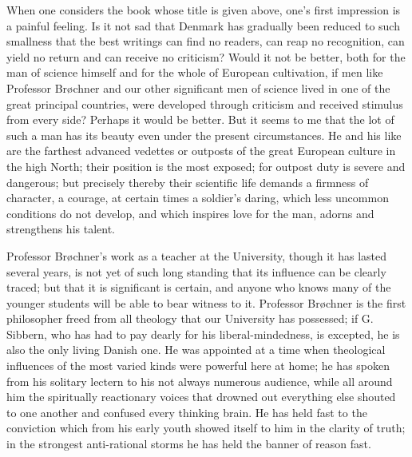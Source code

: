 \documentclass[12pt,a4paper,openany]{book}
\newcommand{\opage}[1]{\marginnote{\footnotesize\textit{[#1]}}}
\begin{document}
When one considers the book whose title is given above, one's
first impression is a painful feeling. Is it not sad that Denmark
has gradually been reduced to such smallness that the best
writings can find no readers, can reap no recognition, can yield
no return and can receive no criticism? Would it not be better,
both for the man of science himself and for the whole of European
cultivation, if men like Professor Brøchner and our other
significant men of science lived in one of the great principal
countries, were developed through criticism and received stimulus
from every side? Perhaps it would be better. But it seems to me
that the lot of such a man has its beauty even under the present
circumstances. He and his like are the farthest advanced vedettes
or outposts of the great European culture in the high North; their
position is the most exposed; for outpost duty is severe and
dangerous; but precisely thereby their scientific life demands a
firmness of character, a courage, at certain times a soldier's
daring, which less uncommon conditions do not develop, and which
inspires
love for the man, adorns and strengthens his talent.

Professor Brøchner's work as a teacher at the University,
though it has lasted several years, is not yet of such long
standing that its influence can be clearly traced; but that it is
significant is certain, and anyone who knows many of the younger
students will be able to bear witness to it. Professor Brøchner
is the first philosopher freed from all theology that our
University has possessed; if G. Sibbern, who has had to pay
dearly for his liberal-mindedness, is excepted, he is also the
only living Danish one. He was appointed at a time when
theological influences of the most varied kinds were powerful here
at home; he has spoken from his solitary lectern to his not always
numerous audience, while all around him the spiritually
reactionary voices that drowned out everything else shouted to one
another and confused every thinking brain. He has held fast to the
conviction which from his early youth showed
\opage{117}itself to him in the clarity of truth; in the strongest
anti-rational storms he has held the banner of reason fast.
\end{document}
